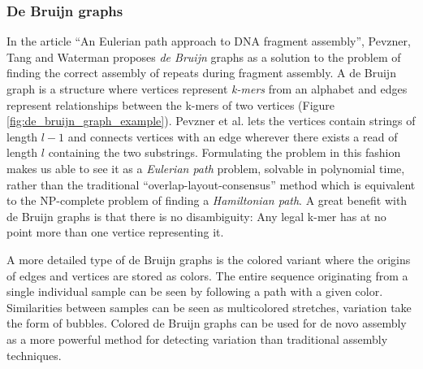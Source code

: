 \documentclass[thesis.tex]{subfiles}
\begin{document}
\subsubsection{De Bruijn graphs}
\label{sec:de_bruijn_graphs}
In the article ``An Eulerian path approach to DNA fragment assembly''\cite{an_eulerian_path_approach_to_dna_fragment_assembly}, Pevzner, Tang and Waterman proposes \textit{de Bruijn} graphs as a solution to the problem of finding the correct assembly of repeats during fragment assembly. A de Bruijn graph is a structure where vertices represent \textit{k-mers} from an alphabet and edges represent relationships between the k-mers of two vertices (Figure \ref{fig:de_bruijn_graph_example}). Pevzner et al. lets the vertices contain strings of length $l-1$ and connects vertices with an edge wherever there exists a read of length $l$ containing the two substrings. Formulating the problem in this fashion makes us able to see it as a \textit{Eulerian path} problem, solvable in polynomial time, rather than the traditional ``overlap-layout-consensus'' method which is equivalent to the NP-complete problem of finding a \textit{Hamiltonian path}\cite[Section 11.1]{algorithms_sequential_parallell_and_distributed}. A great benefit with de Bruijn graphs is that there is no disambiguity: Any legal k-mer has at no point more than one vertice representing it.\\
\par\noindent
A more detailed type of de Bruijn graphs is the colored variant where the origins of edges and vertices are stored as colors. The entire sequence originating from a single individual sample can be seen by following a path with a given color. Similarities between samples can be seen as multicolored stretches, variation take the form of bubbles. Colored de Bruijn graphs can be used for de novo assembly as a more powerful method for detecting variation than traditional assembly techniques\cite{de_novo_assembly_and_genotyping_of_variants_using_colored_de_bruijn_graphs}.
\end{document}
